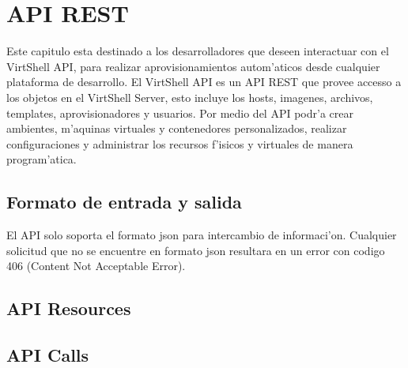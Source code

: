 \chapter{API REST}
\label{capapi}

Este capitulo esta destinado a los desarrolladores que deseen interactuar con el VirtShell API, para realizar aprovisionamientos autom'aticos desde cualquier plataforma de desarrollo. El VirtShell API es un API REST que provee accesso a los objetos en el VirtShell Server, esto incluye los hosts, imagenes, archivos, templates, aprovisionadores y usuarios. Por medio del API podr'a crear ambientes, m'aquinas virtuales y contenedores personalizados, realizar configuraciones y administrar los recursos f'isicos y virtuales de manera program'atica. 

\section{Formato de entrada y salida}
El API solo soporta el formato json para intercambio de informaci'on. Cualquier solicitud que no se encuentre en formato json resultara en un error con codigo 406 (Content Not Acceptable Error).



\section{API Resources}










\section{API Calls}




